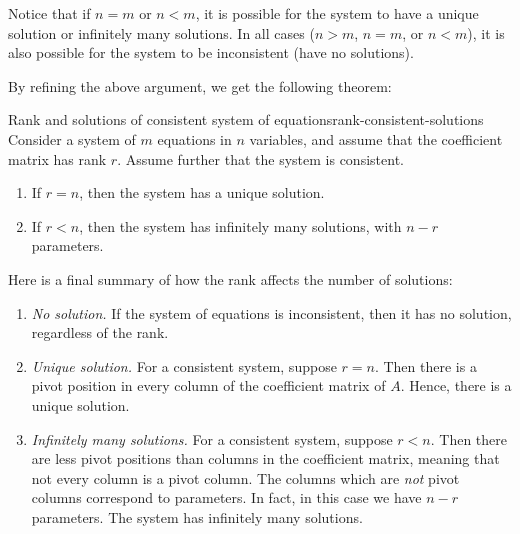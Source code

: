 Notice that if $n=m$ or $n<m$, it is possible for the system to have a
unique solution or infinitely many solutions. In all cases ($n>m$,
$n=m$, or $n<m$), it is also possible for the system to be
inconsistent (have no solutions).

By refining the above argument, we get the following theorem:

\begin{theorem}{Rank and solutions of consistent system of equations}{rank-consistent-solutions}
  Consider a system of $m$ equations in $n$ variables, and assume that
  the coefficient matrix has rank $r$. Assume further that the system
  is consistent.
  \begin{enumerate}
  \item If $r=n$, then the system has a unique solution.
  \item If $r<n$, then the system has infinitely many solutions, with $n-r$ parameters.
  \end{enumerate}
\end{theorem}

Here is a final summary of how the rank affects the number of
solutions:

\begin{enumerate}
\item {\em No solution.} If the system of equations is inconsistent,
  then it has no solution, regardless of the rank.

\item {\em Unique solution.} For a consistent system, suppose
  $r=n$. Then there is a pivot position in every column of the
  coefficient matrix of $A$. Hence, there is a unique solution.

\item {\em Infinitely many solutions.} For a consistent system, suppose
  $r<n$. Then there are less pivot positions than columns in the
  coefficient matrix, meaning that not every column is a pivot
  column. The columns which are {\em not} pivot columns correspond to
  parameters. In fact, in this case we have $n-r$ parameters. The
  system has infinitely many solutions.
\end{enumerate}
